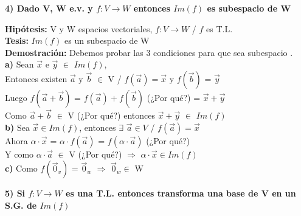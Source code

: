 \documentclass[11pt]{article}
\begin{document}

\vspace{2mm} \noindent
{\Large \bfseries{4) Dado V, W e.v. y $f: V \rightarrow W$ entonces $Im(f)$ es subespacio de W}}

\vspace{2mm} \noindent
{\bfseries Hipótesis:} V y W espacios vectoriales, $f: V \rightarrow W$ / $f$ es T.L. \\
{\bfseries Tesis:} $Im(f)$ es un subespacio de W \\
{\bfseries Demostración:} Debemos probar las 3 condiciones para que sea
subespacio .\\
{\bfseries{a)}} Sean $\vec{x}$ e $\vec{y}$ $\in$ $Im(f)$, \\
Entonces existen $\vec{a}$ y $\vec{b}$ $\in$ V / $f(\vec{a}) = \vec{x}$ y $f(\vec{b})$ = $\vec{y}$ \\
Luego $f(\vec{a} + \vec{b})$ = $f(\vec{a}) + f(\vec{b})$ (¿Por qué?) = $\vec{x} + \vec{y}$\\
Como $\vec{a} + \vec{b}$ $\in$ V (¿Por qué?) entonces $\vec{x} + \vec{y}$ $\in $ $Im(f)$\\
{\bfseries{b)}} Sea $\vec{x} \in Im(f)$, entonces $\exists$ $\vec{a} \in V$ / $f(\vec{a}) = \vec{x}$ \\
Ahora $\alpha \cdot \vec{x}$ = $\alpha \cdot f(\vec{a})$ = $f(\alpha \cdot \vec{a})$ (¿Por qué?)\\
Y como $\alpha \cdot \vec{a}$ $\in$ V (¿Por qué?) $\Rightarrow$ $\alpha \cdot \vec{x} \in Im(f)$ \\
{\bfseries{c)}} Como $f(\vec{0}_v)$ = $\vec{0}_w$ $\Rightarrow$ $\vec{0}_w \in$ W

\vspace{2mm} \noindent
{\Large \bfseries{5) Si $f: V \rightarrow W$ es una T.L. entonces transforma una base de V en un S.G. de $Im(f)$}}
\end{document}
